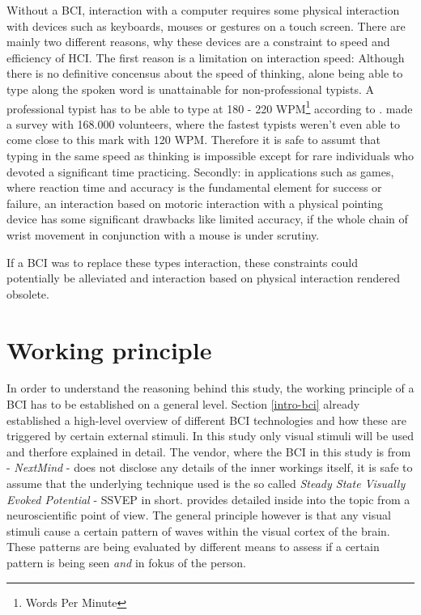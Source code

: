             Without a BCI, interaction with a computer requires some physical interaction with devices such as keyboards, mouses or gestures on a touch screen. There are mainly two different reasons, why these devices are a constraint to speed and efficiency of HCI. The first reason is a limitation on interaction speed: Although there is no definitive concensus about the speed of thinking, alone being able to type along the spoken word is unattainable for non-professional typists. A professional typist has to be able to type at 180 - 220 WPM\footnote{Words Per Minute} according to \cite{NCRA.25052021}. \cite{ScienceDaily.25052021} made a survey with 168.000 volunteers, where the fastest typists weren't even able to come close to this mark with 120 WPM. Therefore it is safe to assumt that typing in the same speed as thinking is impossible except for rare individuals who devoted a significant time practicing. Secondly: in applications such as games, where reaction time and accuracy is the fundamental element for success or failure, an interaction based on motoric interaction with a physical pointing device has some significant drawbacks like limited accuracy, if the whole chain of wrist movement in conjunction with a mouse is under scrutiny. 

            If a BCI was to replace these types interaction, these constraints could potentially be alleviated and interaction based on physical interaction rendered obsolete. 

        \section{Working principle}\label{working-principle}         

            In order to understand the reasoning behind this study, the working principle of a BCI has to be established on a general level. Section \ref*{intro-bci} already established a high-level overview of different BCI technologies and how these are triggered by certain external stimuli. In this study only visual stimuli will be used and therfore explained in detail. The vendor, where the BCI in this study is from - \textit{NextMind} - does not disclose any details of the inner workings itself, it is safe to assume that the underlying technique used is the so called \textit{Steady State Visually Evoked Potential} - SSVEP in short. \cite{Sokol.1976} provides detailed inside into the topic from a neuroscientific point of view. The general principle however is that any visual stimuli cause a certain pattern of waves within the visual cortex of the brain. These patterns are being evaluated by different means to assess if a certain pattern is being seen \textit{and} in fokus of the person. 
            

